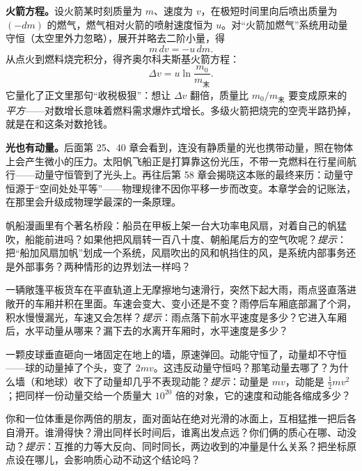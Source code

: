 \begin{challenge}
\textbf{火箭方程。}设火箭某时刻质量为 \(m\)、速度为 \(v\)，在极短时间里向后喷出质量为 \((-dm)\) 的燃气，燃气相对火箭的喷射速度恒为 \(u\)。对“火箭加燃气”系统用动量守恒（太空里外力忽略），展开并略去二阶小量，得
\[
m\,dv=-u\,dm .
\]
从点火到燃料烧完积分，得齐奥尔科夫斯基火箭方程：
\[
\Delta v=u\ln\frac{m_0}{m_{\text{末}}} .
\]
它量化了正文里那句“收税极狠”：想让 \(\Delta v\) 翻倍，质量比 \(m_0/m_{\text{末}}\) 要变成原来的\emph{平方}——对数增长意味着燃料需求爆炸式增长。多级火箭把烧完的空壳半路扔掉，就是在和这条对数抢钱。

\textbf{光也有动量。}后面第 25、40 章会看到，连没有静质量的光也携带动量，照在物体上会产生微小的压力。太阳帆飞船正是打算靠这份光压，不带一克燃料在行星间航行——动量守恒管到了光头上。再往后第 58 章会揭晓这本账的最终来历：动量守恒源于“空间处处平等”——物理规律不因你平移一步而改变。本章学会的记账法，在那里会升级成物理学最深的一条原理。
\end{challenge}

\begin{puzzles}
\item 帆船漫画里有个著名桥段：船员在甲板上架一台大功率电风扇，对着自己的帆猛吹，船能前进吗？如果他把风扇转一百八十度、朝船尾后方的空气吹呢？\emph{提示}：把“船加风扇加帆”划成一个系统，风扇吹出的风和帆挡住的风，是系统内部事务还是外部事务？两种情形的边界划法一样吗？
\item 一辆敞篷平板货车在平直轨道上无摩擦地匀速滑行，突然下起大雨，雨点竖直落进敞开的车厢并积在里面。车速会变大、变小还是不变？雨停后车厢底部漏了个洞，积水慢慢漏光，车速又会怎样？\emph{提示}：雨点落下前水平速度是多少？它进入车厢后，水平动量从哪来？漏下去的水离开车厢时，水平速度是多少？
\item 一颗皮球垂直砸向一堵固定在地上的墙，原速弹回。动能守恒了，动量却不守恒——球的动量掉了个头，变了 \(2mv\)。这违反动量守恒吗？那笔动量去哪了？为什么墙（和地球）收下了动量却几乎不表现动能？\emph{提示}：动量是 \(mv\)，动能是 \(\tfrac12 mv^2\)；把同样一份动量交给一个质量大 \(10^{20}\) 倍的对象，它的速度和动能各缩成多少？
\item 你和一位体重是你两倍的朋友，面对面站在绝对光滑的冰面上，互相猛推一把后各自滑开。谁滑得快？滑出同样长时间后，谁离出发点远？你们俩的质心在哪、动没动？\emph{提示}：互推的力等大反向、同时同长，两边收到的冲量是什么关系？把坐标原点设在哪儿，会影响质心动不动这个结论吗？
\end{puzzles}
